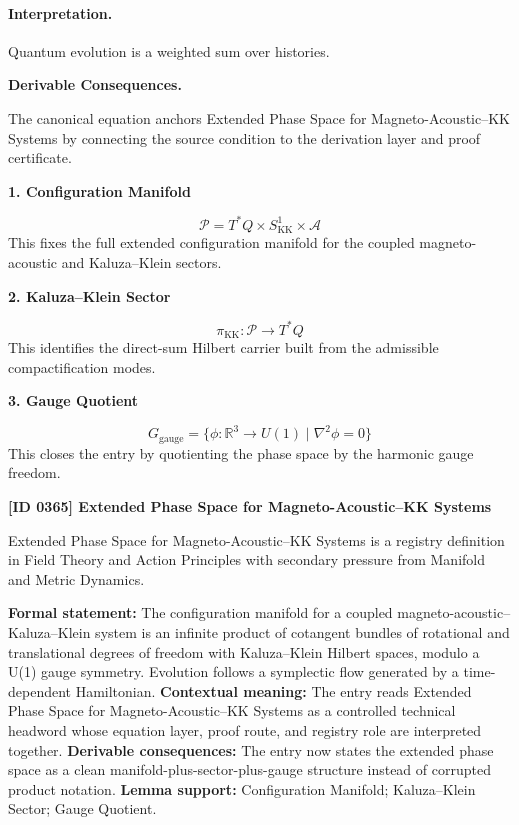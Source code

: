 \paragraph{Interpretation.}
Quantum evolution is a weighted sum over histories.

\par\vspace{0.35em}
\noindent\textbf{Derivable Consequences.}\quad
\begingroup
\footnotesize
\raggedright
The canonical equation anchors Extended Phase Space for Magneto-Acoustic--KK Systems by connecting the source condition to the derivation layer and proof certificate.
\par\endgroup

\noindent\textbf{1. Configuration Manifold}\par
\[
\mathcal{P}=T^{\ast}Q\times S^{1}_{\mathrm{KK}}\times\mathcal{A}
\]
\noindent This fixes the full extended configuration manifold for the coupled magneto-acoustic and Kaluza--Klein sectors.\par
\noindent\textbf{2. Kaluza--Klein Sector}\par
\[
\pi_{\mathrm{KK}}:\mathcal{P}\to T^{\ast}Q
\]
\noindent This identifies the direct-sum Hilbert carrier built from the admissible compactification modes.\par
\noindent\textbf{3. Gauge Quotient}\par
\[
G_{\mathrm{gauge}}=\{\phi:\mathbb{R}^{3}\to U(1)\mid \nabla^{2}\phi=0\}
\]
\noindent This closes the entry by quotienting the phase space by the harmonic gauge freedom.\par

\clearpage
\noindent\textbf{[ID 0365] Extended Phase Space for Magneto-Acoustic--KK Systems}\par
\vspace{0.35em}
\begingroup\small
{}
Extended Phase Space for Magneto-Acoustic--KK Systems is a registry definition in Field Theory and Action Principles with secondary pressure from Manifold and Metric Dynamics.

\begingroup\footnotesize\setlength{\emergencystretch}{3em}\sloppy
\textbf{Formal statement:} The configuration manifold for a coupled magneto-acoustic--Kaluza--Klein system is an infinite product of cotangent bundles of rotational and translational degrees of freedom with Kaluza--Klein Hilbert spaces, modulo a U(1) gauge symmetry. Evolution follows a symplectic flow generated by a time-dependent Hamiltonian. \textbf{Contextual meaning:} The entry reads Extended Phase Space for Magneto-Acoustic--KK Systems as a controlled technical headword whose equation layer, proof route, and registry role are interpreted together. \textbf{Derivable consequences:} The entry now states the extended phase space as a clean manifold-plus-sector-plus-gauge structure instead of corrupted product notation. \textbf{Lemma support:} Configuration Manifold; Kaluza--Klein Sector; Gauge Quotient.\par
\endgroup


